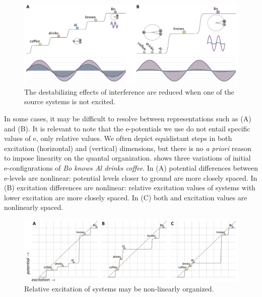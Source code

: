   
\begin{figure}
\includegraphics[width=\textwidth]{figures/Tilsen-img95.png}
\caption{The destabilizing effects of interference are reduced when one of the source systems is not excited.}
\label{fig:4:45}
\end{figure}

   In some cases, it may be difficult to resolve between representations such as (A) and (B). It is relevant to note that the e-potentials we use do not entail specific values of e, only relative values. We often depict equidistant steps in both excitation (horizontal) and  (vertical) dimensions, but there is no {\textit{a priori}} reason to impose linearity on the quantal organization. {} shows three variations of initial e-configurations of \textit{Bo knows Al drinks coffee}. In (A) potential differences between e-levels are nonlinear: potential levels closer to ground are more closely spaced. In (B) excitation differences are nonlinear: relative excitation values of systems with lower excitation are more closely spaced. In (C) both  and excitation values are nonlinearly spaced.

  
\begin{figure}
\includegraphics[width=\textwidth]{figures/Tilsen-img96.png}
\caption{Relative excitation of systems may be non-linearly organized.}
\label{fig:4:46}
\end{figure}
   

